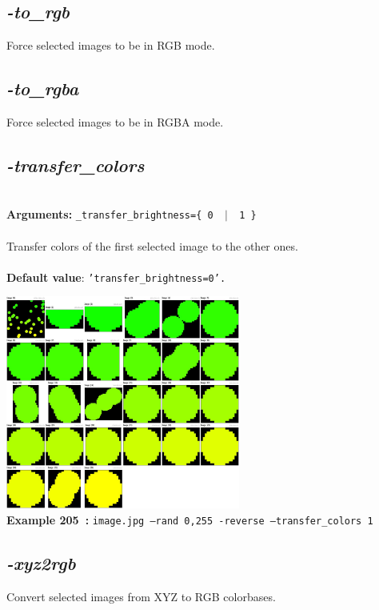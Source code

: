 \documentclass[a4paper,11pt,twoside]{book}
\begin{document}
\subsection{\emph{-to\_rgb} }\vspace*{-0.5em}
Force selected images to be in RGB mode.


\subsection{\emph{-to\_rgba} }\vspace*{-0.5em}
Force selected images to be in RGBA mode.


\subsection{\emph{-transfer\_colors} }\vspace*{-0.5em}
~\\\textbf{Arguments: } 
{\small \texttt{\_transfer\_brightness=\{ 0 ~$|$~ 1 \}}}\\~\\
Transfer colors of the first selected image to the other ones.
~\\~\\\textbf{Default value}: {\small \texttt{'transfer\_brightness=0'.}}
\begin{center}\includegraphics[keepaspectratio=true,height=7cm,width=\textwidth]{img/gmic_def205.jpg}\\
{\footnotesize \textbf{Example 205~:} \texttt{image.jpg --rand 0,255 -reverse --transfer\_colors 1}}
\end{center}

\subsection{\emph{-xyz2rgb} }\vspace*{-0.5em}
Convert selected images from XYZ to RGB colorbases.
\end{document}
